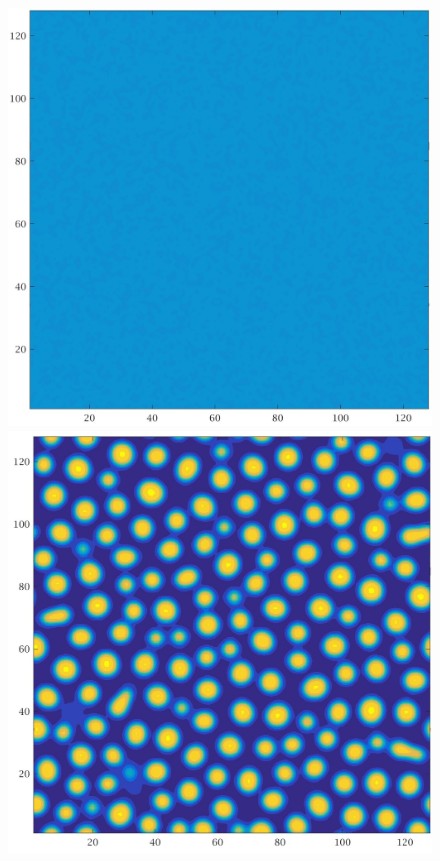 \documentclass[a4paper,6pt]{article}
\begin{document}
\begin{figure}[H]
        \begin{minipage}[b]{.32\linewidth}        
                \centering
                \includegraphics[width=1\textwidth]{pics/C1_t1.jpg}
        \end{minipage}
        \begin{minipage}[b]{.32\linewidth}
                \centering
                \includegraphics[width=1\textwidth]{pics/C1_t2.jpg}

\end{minipage}
\end{figure}
\end{document}
